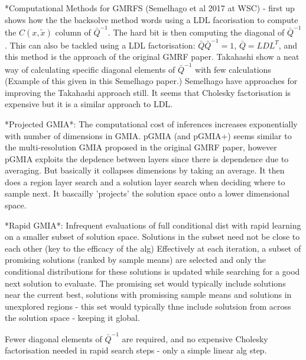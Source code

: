 \documentclass{article}
\begin{document}
*Computational Methods for GMRFS (Semelhago et al 2017 at WSC) - first up shows how the the backsolve method words using a LDL facorisation to compute the $C(x,\tilde{x})$ column of $\bar{Q}^{-1}$. The hard bit is then computing the diagonal of $\bar{Q}^{-1}$. This can also be tackled using a LDL factorisation: $\bar{Q}\bar{Q}^{-1}=1$, $\bar{Q} = LDL^{T}$, and this method is the approach of the original GMRF paper. Takahashi show a neat way of calculating specific diagonal elements of $\bar{Q}^{-1}$ with few calculations (Example of this given in this Semelhago paper.) Semelhago have approaches for improving the Takahashi approach still. It seems that Cholesky factorisation is expensive but it is a similar approach to LDL.

*Projected GMIA*: The computational cost of inferences increases exponentially with number of dimensions in GMIA. pGMIA (and pGMIA+) seems similar to the multi-resolution GMIA proposed in the original GMRF paper, however pGMIA exploits the depdence between layers since there is dependence due to averaging. But basically it collapses dimensions by taking an average. It then does a region layer search and a solution layer search when deciding where to sample next. It bascailly 'projects' the solution space onto a lower dimensional space. \newline

*Rapid GMIA*: Infrequent evaluations of full conditional dist with rapid learning on a smaller subset of solution space. Solutions in the subset need not be close to each other (key to the efficacy of the alg) Effectively at each iteration, a subset of promising solutions (ranked by sample means) are selected and only the conditional distributions for these solutions is updated while searching for a good next solution to evaluate. The promising set would typically include solutions near the current best, solutions with promissing sample means and solutions in unexplored regions - this set would typically thne include solutsion from across the solution space - keeping it global. \newline

Fewer diagonal elements of $\bar{Q}^{-1}$ are required, and no expensive Cholesky factorisation needed in rapid search steps - only a simple linear alg step. \newline
\end{document}
